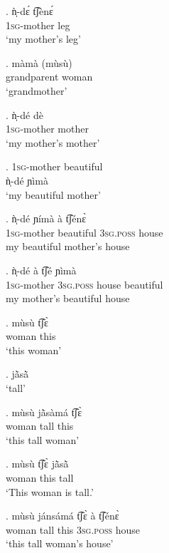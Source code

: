 \documentclass{assets/fieldnotes}
\begin{document}
\exg. ǹ̩-dɛ́ t͡ʃènɛ́\\
\textsc{1sg}-mother leg\\
`my mother’s leg'

\exg. màmà (mùsù)\\
grandparent woman\\
`grandmother'

\exg. ǹ̩-dé dè\\
\textsc{1sg}-mother mother\\
`my mother's mother'

\exg. \textsc{1sg}-mother beautiful\\
ǹ̩-dé ɲìmà\\
`my beautiful mother'

\exg. ǹ̩-dé ɲímà à t͡ʃénɛ̀\\
\textsc{1sg}-mother beautiful \textsc{3sg.poss} house\\
my beautiful mother’s house

\exg. ǹ̩-dé à t͡ʃé ɲìmà\\
\textsc{1sg}-mother \textsc{3sg.poss} house beautiful\\
my mother’s beautiful house


\exg. mùsù t͡ʃɛ̀\\
woman this\\
`this woman’

\ex. jã̀sã̀\\
`tall'


\exg. mùsù jã̀sàmá t͡ʃɛ̀\\
woman tall this\\
`this tall woman’

\exg. mùsù t͡ʃɛ̀ jã̀sã̀\\
woman this tall\\
`This woman is tall.’

\exg. mùsù jánsámá t͡ʃɛ̀ à t͡ʃénɛ̀\\
woman tall this \textsc{3sg.poss} house\\
`this tall woman’s house’
\end{document}
